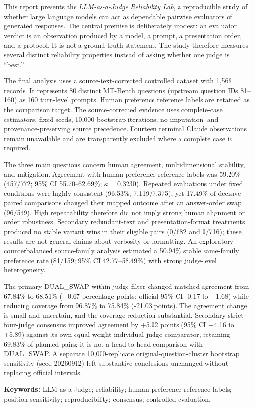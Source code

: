 This report presents the \emph{LLM-as-a-Judge Reliability Lab}, a reproducible study of whether large language models can act as dependable pairwise evaluators of generated responses. The central premise is deliberately modest: an evaluator verdict is an observation produced by a model, a prompt, a presentation order, and a protocol. It is not a ground-truth statement. The study therefore measures several distinct reliability properties instead of asking whether one judge is ``best.''

The final analysis uses a source-text-corrected controlled dataset with 1,568 records. It represents 80 distinct MT-Bench questions (upstream question IDs 81--160) as 160 turn-level prompts. Human preference reference labels are retained as the comparison target. The source-corrected evidence uses complete-case estimators, fixed seeds, 10,000 bootstrap iterations, no imputation, and provenance-preserving source precedence. Fourteen terminal Claude observations remain unavailable and are transparently excluded where a complete case is required.

The three main questions concern human agreement, multidimensional stability, and mitigation. Agreement with human preference reference labels was 59.20\% (457/772; 95\% CI 55.70--62.69\%; $\kappa=0.3230$). Repeated evaluations under fixed conditions were highly consistent (96.53\%, 7,119/7,375), yet 17.49\% of decisive paired comparisons changed their mapped outcome after an answer-order swap (96/549). High repeatability therefore did not imply strong human alignment or order robustness. Secondary redundant-text and presentation-format treatments produced no stable variant wins in their eligible pairs (0/682 and 0/716); these results are not general claims about verbosity or formatting. An exploratory counterbalanced source-family analysis estimated a 50.94\% stable same-family preference rate (81/159; 95\% CI 42.77--58.49\%) with strong judge-level heterogeneity.

The primary DUAL\_SWAP within-judge filter changed matched agreement from 67.84\% to 68.51\% (+0.67 percentage points; official 95\% CI -0.17 to +1.68) while reducing coverage from 96.87\% to 75.84\% (-21.03 points). The agreement change is small and uncertain, and the coverage reduction substantial. Secondary strict four-judge consensus improved agreement by +5.02 points (95\% CI +4.16 to +5.89) against its own equal-weight individual-judge comparator, retaining 69.83\% of planned pairs; it is not a head-to-head comparison with DUAL\_SWAP. A separate 10,000-replicate original-question-cluster bootstrap sensitivity (seed 20260912) left substantive conclusions unchanged without replacing official intervals.

\textbf{Keywords:} LLM-as-a-Judge; reliability; human preference reference labels; position sensitivity; reproducibility; consensus; controlled evaluation.
